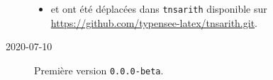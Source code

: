 \documentclass[12pt,a4paper]{article}
\begin{document}
\begin{description}
    \begin{itemize}[itemsep=.5em]
        \item {}  et  ont été déplacées dans \texttt{tnsarith} disponible sur \url{https://github.com/typensee-latex/tnsarith.git}.
    \end{itemize}
    
    \separation


    \medskip
    \item[2020-07-10] Première version \verb+0.0.0-beta+.


\end{description}
\end{document}
